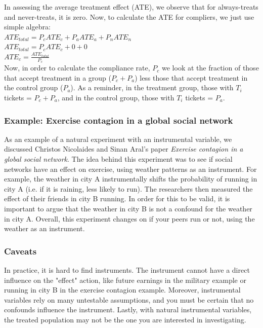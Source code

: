 In assessing the average treatment effect (ATE), we observe that for always-treats and never-treats, it is zero. Now, to calculate the ATE for compliers, we just use simple algebra:\\

$ATE_{total} = P_c ATE_c + P_a ATE_a + P_n ATE_n$\\

$ATE_{total} = P_c ATE_c + 0 + 0$\\

$ATE_c = \frac{ATE_{total}}{P_c}$\\

Now, in order to calculate the compliance rate, $P_c$ we look at the fraction of those that accept treatment in a group ($P_c+P_a$) less those that accept treatment in the control group ($P_a$).  As a reminder, in the treatment group, those with $T_i$ tickets = $P_c+P_a$, and in the control group, those with $T_i$ tickets = $P_a$. 

\subsubsection{Example: Exercise contagion in a global social network}

As an example of a natural experiment with an instrumental variable, we discussed Christos Nicolaides and Sinan Aral's paper \textit{Exercise contagion in a global social network}.  The idea behind this experiment was to see if social networks have an effect on exercise, using weather patterns as an instrument.  For example, the weather in city A instrumentally shifts the probability of running in city A (i.e. if it is raining, less likely to run). The researchers then measured the effect of their friends in city B running.  In order for this to be valid, it is important to argue that the weather in city B is not a confound for the weather in city A.  Overall, this experiment changes on if your peers run or not, using the weather as an instrument. 

\subsubsection{Caveats}

In practice, it is hard to find instruments.  The instrument cannot have a direct influence on the "effect" action, like future earnings in the military example or running in city B in the exercise contagion example.  Moreover, instrumental variables rely on many untestable assumptions, and you must be certain that no confounds influence the instrument.  Lastly, with natural instrumental variables, the treated population may not be the one you are interested in investigating.

